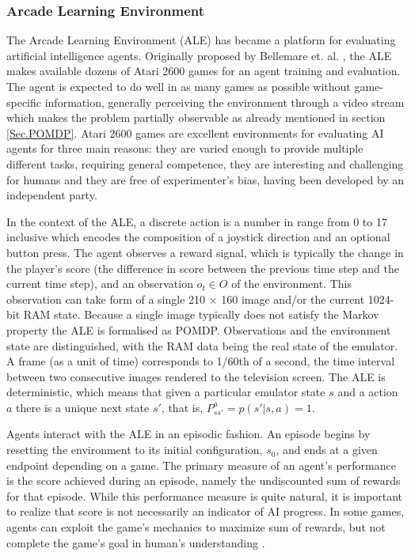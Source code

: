 \subsubsection{Arcade Learning Environment} \label{Sec.ALE}

The Arcade Learning Environment (ALE) has became a platform for evaluating artificial intelligence agents. Originally proposed by Bellemare et. al. \cite{Code.ALE}, the ALE makes available dozens of Atari 2600 games for an agent training and evaluation. The agent is expected to do well in as many games as possible without game-specific information, generally perceiving the environment through a video stream which makes the problem partially observable as already mentioned in section \ref{Sec.POMDP}. Atari 2600 games are excellent environments for evaluating AI agents for three main reasons: they are varied enough to provide multiple different tasks, requiring general competence, they are interesting and challenging for humans and they are free of experimenter’s bias, having been developed by an independent party.

In the context of the ALE, a discrete action is a number in range from 0 to 17 inclusive which encodes the composition of a joystick direction and an optional button press. The agent observes a reward signal, which is typically the change in the player’s score (the difference in score between the previous time step and the current time step), and an observation $o_t \in O$ of the environment. This observation can take form of a single 210 × 160 image and/or the current 1024-bit RAM state. Because a single image typically does not satisfy the Markov property the ALE is formalised as POMDP. Observations and the environment state are distinguished, with the RAM data being the real state of the emulator. A frame (as a unit of time) corresponds to 1/60th of a second, the time interval between two consecutive images rendered to the television screen. The ALE is deterministic, which means that given a particular emulator state $s$ and a action $a$ there is a unique next state $s'$, that is, $P^a_{ss'} = p(s' | s, a) = 1$.

Agents interact with the ALE in an episodic fashion. An episode begins by resetting the environment to its initial configuration, $s_0$, and ends at a given endpoint depending on a game. The primary measure of an agent’s performance is the score achieved during an episode, namely the undiscounted sum of rewards for that episode. While this performance measure is quite natural, it is important to realize that score is not necessarily an indicator of AI progress. In some games, agents can exploit the game's mechanics to maximize sum of rewards, but not complete the game's goal in human's understanding \cite{Study.FaultyReward}.

